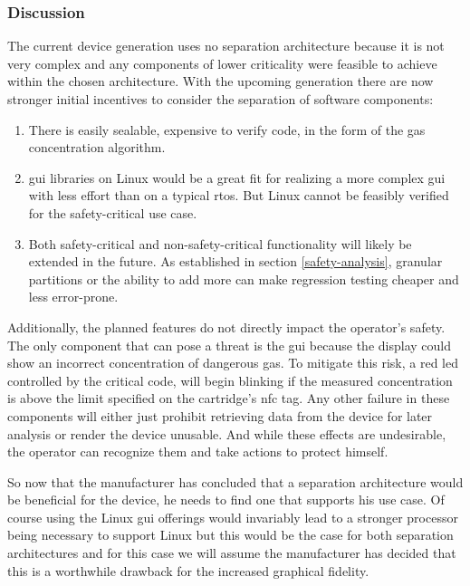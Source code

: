 \subsubsection{Discussion}
The current device generation uses no separation architecture because it is not very complex and any components of lower criticality were feasible to achieve within the chosen architecture. With the upcoming generation there are now stronger initial incentives to consider the separation of software components:
\begin{enumerate}
\item There is easily sealable, expensive to verify code, in the form of the gas concentration algorithm.
\item \acrshort{gui} libraries on Linux would be a great fit for realizing a more complex \acrshort{gui} with less effort than on a typical \acrshort{rtos}. But Linux cannot be feasibly verified for the safety-critical use case.
\item Both safety-critical and non-safety-critical functionality will likely be extended in the future. As established in section \ref{safety-analysis}, granular partitions or the ability to add more can make regression testing cheaper and less error-prone.
\end{enumerate}
Additionally, the planned features do not directly impact the operator's safety. The only component that can pose a threat is the \acrshort{gui} because the display could show an incorrect concentration of dangerous gas. To mitigate this risk, a red \acrshort{led} controlled by the critical code, will begin blinking if the measured concentration is above the limit specified on the cartridge's \acrshort{nfc} tag. Any other failure in these components will either just prohibit retrieving data from the device for later analysis or render the device unusable. And while these effects are undesirable, the operator can recognize them and take actions to protect himself.

So now that the manufacturer has concluded that a separation architecture would be beneficial for the device, he needs to find one that supports his use case.  Of course using the Linux \acrshort{gui} offerings would invariably lead to a stronger processor being necessary to support Linux but this would be the case for both separation architectures and for this case we will assume the manufacturer has decided that this is a worthwhile drawback for the increased graphical fidelity. 

